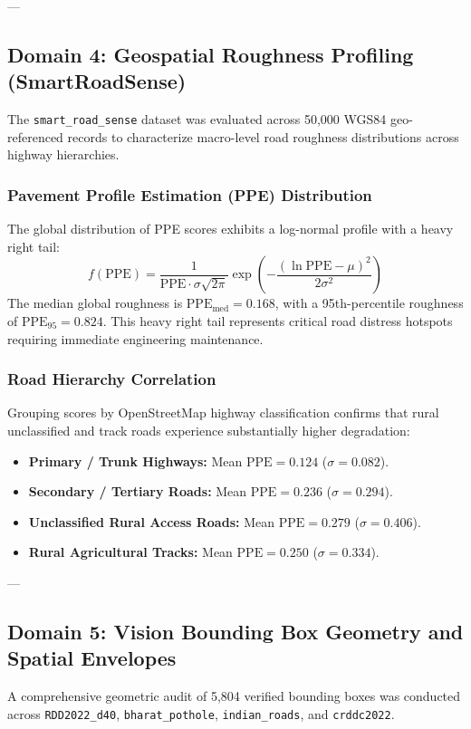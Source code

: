 ---

\subsection{Domain 4: Geospatial Roughness Profiling (SmartRoadSense)}
The \texttt{smart\_road\_sense} dataset was evaluated across 50,000 WGS84 geo-referenced records to characterize macro-level road roughness distributions across highway hierarchies.

\subsubsection{Pavement Profile Estimation (PPE) Distribution}
The global distribution of PPE scores exhibits a log-normal profile with a heavy right tail:
\begin{equation}
f(\text{PPE}) = \frac{1}{\text{PPE} \cdot \sigma \sqrt{2\pi}} \exp\left( -\frac{(\ln \text{PPE} - \mu)^2}{2\sigma^2} \right)
\end{equation}
The median global roughness is $\text{PPE}_{\text{med}} = 0.168$, with a 95th-percentile roughness of $\text{PPE}_{95} = 0.824$. This heavy right tail represents critical road distress hotspots requiring immediate engineering maintenance.

\subsubsection{Road Hierarchy Correlation}
Grouping scores by OpenStreetMap highway classification confirms that rural unclassified and track roads experience substantially higher degradation:
\begin{itemize}
    \item \textbf{Primary / Trunk Highways:} Mean $\text{PPE} = 0.124$ ($\sigma = 0.082$).
    \item \textbf{Secondary / Tertiary Roads:} Mean $\text{PPE} = 0.236$ ($\sigma = 0.294$).
    \item \textbf{Unclassified Rural Access Roads:} Mean $\text{PPE} = 0.279$ ($\sigma = 0.406$).
    \item \textbf{Rural Agricultural Tracks:} Mean $\text{PPE} = 0.250$ ($\sigma = 0.334$).
\end{itemize}

---

\subsection{Domain 5: Vision Bounding Box Geometry and Spatial Envelopes}
A comprehensive geometric audit of 5,804 verified bounding boxes was conducted across \texttt{RDD2022\_d40}, \texttt{bharat\_pothole}, \texttt{indian\_roads}, and \texttt{crddc2022}.

